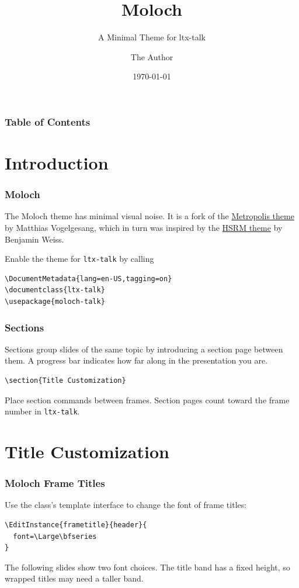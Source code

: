 \documentclass[10pt,aspect-ratio=4:3]{ltx-talk}
\title{Moloch}
\subtitle{A Minimal Theme for ltx-talk}
\date{\today}
\author{The Author}
\institute{Some Institution, Some University}
\begin{document}
\maketitle[element-order={logo,title,subtitle,titleseparator,author,institute,date}]

\begin{frame}
  \frametitle{Table of Contents}
  \tableofcontents
\end{frame}

\section{Introduction}

\begin{frame*}
  \frametitle{Moloch}

  The Moloch theme has minimal visual noise. It is a fork of the
  \href{https://github.com/matze/mtheme}{Metropolis theme} by Matthias Vogelgesang,
  which in turn was inspired by the
  \href{https://github.com/hsrmbeamertheme/hsrmbeamertheme}{HSRM theme}
  by Benjamin Weiss. \medskip

  Enable the theme for \texttt{ltx-talk} by calling
  \begin{verbatim}
\DocumentMetadata{lang=en-US,tagging=on}
\documentclass{ltx-talk}
\usepackage{moloch-talk}
  \end{verbatim}
\end{frame*}

\begin{frame*}
  \frametitle{Sections}
  Sections group slides of the same topic by introducing a section page between
  them. A progress bar indicates how far along in the presentation you are.

  \begin{verbatim}
\section{Title Customization}
  \end{verbatim}

  Place section commands between frames. Section pages count toward the frame
  number in \texttt{ltx-talk}.
\end{frame*}

\section{Title Customization}

\begin{frame*}
  \frametitle{Moloch Frame Titles}
  Use the class's template interface to change the font of frame titles:
  \begin{verbatim}
\EditInstance{frametitle}{header}{
  font=\Large\bfseries
}
  \end{verbatim}

  The following slides show two font choices. The title band has a fixed height,
  so wrapped titles may need a taller band.
\end{frame*}
\end{document}
